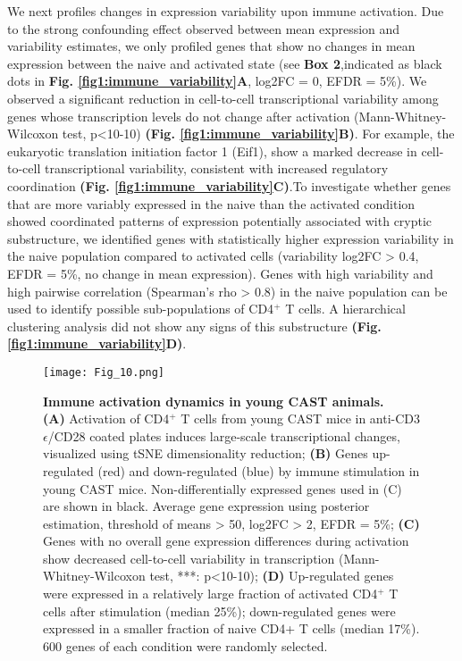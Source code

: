 We next profiles changes in expression variability upon immune activation. Due to the strong confounding effect observed between mean expression and variability estimates, we only profiled genes that show no changes in mean expression between the naive and activated state (see \textbf{Box 2},indicated as black dots in \textbf{Fig. \ref{fig1:immune_variability}A}, log2FC = 0, EFDR = 5\%). We observed a significant reduction in cell-to-cell transcriptional variability among genes whose transcription levels do not change after activation (Mann-Whitney-Wilcoxon test, p<10-10) \textbf{(Fig. \ref{fig1:immune_variability}B)}. For example, the eukaryotic translation initiation factor 1 (Eif1), show a marked decrease in cell-to-cell transcriptional variability, consistent with increased regulatory coordination \textbf{(Fig. \ref{fig1:immune_variability}C)}.To investigate whether genes that are more variably expressed in the naive than the activated condition showed coordinated patterns of expression potentially associated with cryptic substructure, we identified genes with statistically higher expression variability in the naive population compared to activated cells (variability log2FC > 0.4, EFDR = 5\%, no change in mean expression). Genes with high variability and high pairwise correlation (Spearman’s rho > 0.8) in the naive population can be used to identify possible sub-populations of CD4$^+$ T cells. A hierarchical clustering analysis did not show any signs of this substructure \textbf{(Fig. \ref{fig1:immune_variability}D)}. 

\begin{figure}[!ht]
\centering
\texttt{[image: Fig\_10.png]}
\caption[Immune activation dynamics in young CAST animals]{\textbf{Immune activation dynamics in young CAST animals.}\\
\textbf{(A)} Activation of CD4$^+$ T cells from young CAST mice in anti-CD3$\epsilon$/CD28 coated plates induces large-scale transcriptional changes, visualized using tSNE dimensionality reduction; \textbf{(B)} Genes up-regulated (red) and down-regulated (blue) by immune stimulation in young CAST mice. Non-differentially expressed genes used in (C) are shown  in black. Average gene expression using posterior estimation, threshold of means > 50, log2FC > 2, EFDR = 5\%; \textbf{(C)} Genes with no overall gene expression differences during activation show decreased cell-to-cell variability in transcription (Mann-Whitney-Wilcoxon test, ***: p<10-10); \textbf{(D)} Up-regulated genes were expressed in a relatively large fraction of activated CD4$^+$ T cells after stimulation (median 25\%); down-regulated genes were expressed in a smaller fraction of naive CD4+ T cells (median 17\%). 600 genes of each condition were randomly selected.
}
\label{fig1:immune_activation_CAST}
\end{figure}

